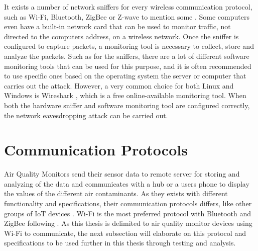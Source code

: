 It exists a number of network sniffers for every wireless communication protocol, such as Wi-Fi, Bluetooth, ZigBee or Z-wave to mention some \cite{Sniffingtech}. Some computers even have a built-in network card that can be used to monitor traffic, not directed to the computers address, on a wireless network. Once the sniffer is configured to capture packets, a monitoring tool is necessary to collect, store and analyze the packets. Such as for the sniffers, there are a lot of different software monitoring tools that can be used for this purpose, and it is often recommended to use specific ones based on the operating system the server or computer that carries out the attack. However, a very common choice for both Linux and Windows is Wireshark \cite{Wireshark}, which is a free online-available monitoring tool. When both the hardware sniffer and software monitoring tool are configured correctly, the network eavesdropping attack can be carried out. 

\section{Communication Protocols}
Air Quality Monitors send their sensor data to remote server for storing and analyzing of the data and communicates with a hub or a users phone to display the values of the different air contaminants. As they exists with different functionality and specifications, their communication protocols differs, like other groups of IoT devices \cite{AQMBigSource}. Wi-Fi is the most preferred protocol with Bluetooth and ZigBee following \cite{saini2020indoor}. As this thesis is delimited to air quality monitor devices using Wi-Fi to communicate, the next subsection will elaborate on this protocol and specifications to be used further in this thesis through testing and analysis. 

